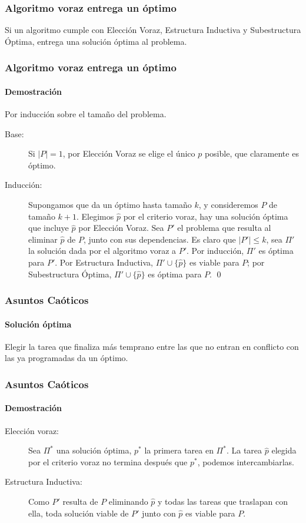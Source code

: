 \documentclass[english, spanish, fleqn,%
hyperref = {colorlinks, urlcolor = blue}%
]{beamer}
\begin{document}
\begin{frame}
  \frametitle{Algoritmo voraz entrega un óptimo}

  \begin{theorem}
    \label{theo:esquema-voraz}
    Si un algoritmo cumple con Elección Voraz, Estructura Inductiva
    y Subestructura Óptima,
    entrega una solución óptima al problema.
  \end{theorem}
\end{frame}

\begin{frame}
  \setcounter{beamerpauses}{2}
  \frametitle{Algoritmo voraz entrega un óptimo}
  \framesubtitle{Demostración}

  Por inducción sobre el tamaño del problema.
  \begin{description}
  \item[Base:]
    Si \(\lvert P \rvert = 1\),
    por Elección Voraz se elige el único \(p\) posible,
    que claramente es óptimo.
  \item[Inducción:]
    Supongamos que da un óptimo hasta tamaño \(k\),
    y consideremos \(P\) de tamaño \(k + 1\).
    Elegimos \(\widehat{p}\) por el criterio voraz,
    hay una solución óptima que incluye \(\widehat{p}\)
    por Elección Voraz.
    Sea \(P'\) el problema
    que resulta al eliminar \(\widehat{p}\) de \(P\),
    junto con sus dependencias.
    Es claro que \(\lvert P' \rvert \le k\),
    sea \(\Pi'\) la solución dada por el algoritmo voraz a \(P'\).
    Por inducción,
    \(\Pi'\) es óptima para \(P'\).
    Por Estructura Inductiva,
    \(\Pi' \cup \{ \widehat{p} \}\) es viable para \(P\);
    por Subestructura Óptima,
    \(\Pi' \cup \{ \widehat{p} \}\) es óptima para \(P\).
    \qed
  \end{description}
\end{frame}

\begin{frame}
  \frametitle{Asuntos Caóticos}
  \framesubtitle{Solución óptima}

  \begin{theorem}
    Elegir la tarea que finaliza más temprano
    entre las que no entran en conflicto con las ya programadas
    da un óptimo.
  \end{theorem}
\end{frame}

\begin{frame}
  \setcounter{beamerpauses}{2}
  \frametitle{Asuntos Caóticos}
  \framesubtitle{Demostración}

  \begin{description}
  \item[Elección voraz:]
    Sea \(\Pi^*\) una solución óptima,
    \(p^*\) la primera tarea en \(\Pi^*\).
    La tarea \(\widehat{p}\) elegida por el criterio voraz
    no termina después que \(p^*\),
    podemos intercambiarlas.
  \item[Estructura Inductiva:]
    Como \(P'\) resulta de \(P\) eliminando \(\widehat{p}\)
    y todas las tareas que traslapan con ella,
    toda solución viable de \(P'\)
    junto con \(\widehat{p}\) es viable para \(P\).
  \end{description}
\end{frame}
\end{document}
